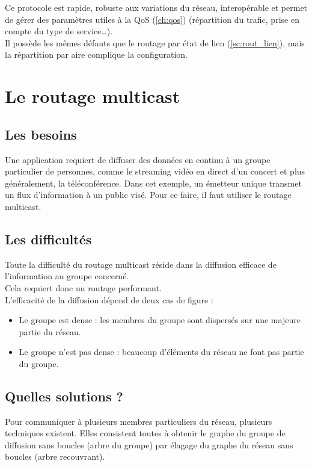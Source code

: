Ce protocole est rapide, robuste aux variations du réseau, interopérable et permet de gérer des paramètres utiles à la QoS (\ref{ch:qos}) (répartition du trafic, prise en compte du type de service…).
\\
Il possède les mêmes défauts que le routage par état de lien (\ref{sc:rout_lien}), mais la répartition par aire complique la configuration.

  \section{Le routage multicast}\label{sc:rout_multicast}
  
  \subsection{Les besoins}
Une application requiert de diffuser des données en continu à un groupe particulier de personnes, comme le streaming vidéo en direct d’un concert et plus généralement, la téléconférence. Dans cet exemple, un émetteur unique transmet un flux d’information à un public visé. Pour ce faire, il faut utiliser le routage multicast.

  \subsection{Les difficultés}
Toute la difficulté du routage multicast réside dans la diffusion efficace de l’information au groupe concerné.
\\
Cela requiert donc un routage performant.
\\
L’efficacité de la diffusion dépend de deux cas de figure :
  \begin{itemize}
  \item Le groupe est dense : les membres du groupe sont dispersés sur une majeure partie du réseau.
  \item Le groupe n’est pas dense : beaucoup d’éléments du réseau ne font pas partie du groupe.
  \end{itemize}

  \subsection{Quelles solutions ?}
Pour communiquer à plusieurs membres particuliers du réseau, plusieurs techniques existent. Elles consistent toutes à obtenir le graphe du groupe de diffusion sans boucles (arbre du groupe) par élagage du graphe du réseau sans boucles (arbre recouvrant).

